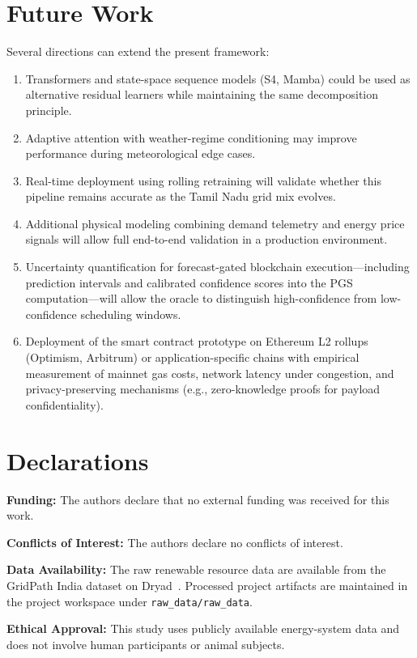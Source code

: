 \documentclass{ieeeaccess}
\begin{document}
\section{Future Work}
Several directions can extend the present framework:
\begin{enumerate}
\item Transformers and state-space sequence models (S4, Mamba) could be used as alternative residual learners while maintaining the same decomposition principle.
\item Adaptive attention with weather-regime conditioning may improve performance during meteorological edge cases.
\item Real-time deployment using rolling retraining will validate whether this pipeline remains accurate as the Tamil Nadu grid mix evolves.
\item Additional physical modeling combining demand telemetry and energy price signals will allow full end-to-end validation in a production environment.
\item Uncertainty quantification for forecast-gated blockchain execution---including prediction intervals and calibrated confidence scores into the PGS computation---will allow the oracle to distinguish high-confidence from low-confidence scheduling windows.
\item Deployment of the smart contract prototype on Ethereum L2 rollups (Optimism, Arbitrum) or application-specific chains with empirical measurement of mainnet gas costs, network latency under congestion, and privacy-preserving mechanisms (e.g., zero-knowledge proofs for payload confidentiality).
\end{enumerate}

\section*{Declarations}
\textbf{Funding:} The authors declare that no external funding was received for this work.

\textbf{Conflicts of Interest:} The authors declare no conflicts of interest.

\textbf{Data Availability:} The raw renewable resource data are available from the GridPath India dataset on Dryad~\cite{gridpath}. Processed project artifacts are maintained in the project workspace under \texttt{raw\_data/raw\_data}.

\textbf{Ethical Approval:} This study uses publicly available energy-system data and does not involve human participants or animal subjects.
\end{document}
